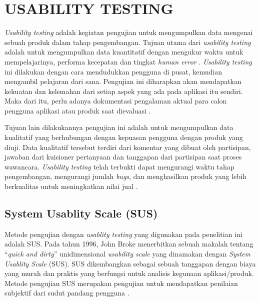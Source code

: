 \section{\uppercase{USABILITY TESTING}}
\textit{Usability testing} adalah kegiatan pengujian untuk mengumpulkan data mengenai sebuah produk dalam tahap pengembangan. Tujuan utama dari \textit{usability testing} adalah untuk mengumpulkan data kuantitatif dengan mengukur waktu untuk mempelajarinya, performa kecepatan dan tingkat \textit{human error} \citep{Wahl2000}. \textit{Usability testing} ini dilakukan dengan cara mendudukkan pengguna di pusat, kemudian mengambil pelajaran dari sana. Pengujian ini diharapkan akan mendapatkan kekuatan dan kelemahan dari setiap aspek yang ada pada aplikasi itu sendiri. Maka dari itu, perlu adanya dokumentasi pengalaman aktual para calon pengguna aplikasi atau produk saat dievaluasi \citep{Wesfix2017}.

\par Tujuan lain dilakukannya pengujian ini adalah untuk mengumpulkan data kualitatif yang berhubungan dengan kepuasan pengguna dengan produk yang diuji. Data kualitatif tersebut terdiri dari komentar yang dibuat oleh partisipan, jawaban dari kuisioner pertanyaan dan tanggapan dari partisipan saat proses wawancara. \textit{Usability testing} telah terbukti dapat mengurangi waktu tahap pengembangan, mengurangi jumlah \textit{bugs}, dan menghasilkan produk yang lebih berkualitas untuk meningkatkan nilai jual \citep{Wahl2000}.

\subsection{System Usablity Scale (SUS)}
Metode pengujian dengan \textit{usablity testing} yang digunakan pada penelitian ini adalah SUS. Pada tahun 1996, John Broke menerbitkan sebuah makalah tentang “\textit{quick and dirty}” unidimensional \textit{usability scale} yang dinamakan dengan \textit{System Usablity Scale} (SUS). SUS dikembangkan sebagai sebuah tanggapan dengan biaya yang murah dan praktis yang berfungsi untuk analisis kegunaan aplikasi/produk. Metode pengujian SUS merupakan pengujian untuk mendapatkan penilaian subjektif dari sudut pandang pengguna \citep{Brooke1996}.


